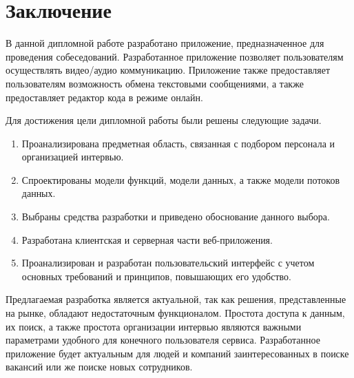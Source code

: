 \section{Заключение}\label{sec:closing}\indent

В данной дипломной работе разработано приложение, предназначенное для проведения собеседований.
Разработанное приложение позволяет пользователям осуществлять видео/аудио коммуникацию.
Приложение также предоставляет пользователям возможность обмена текстовыми сообщениями, а также предоставляет редактор кода в режиме онлайн.

Для достижения цели дипломной работы были решены следующие задачи.
\begin{enumerate}
    \item Проанализирована предметная область, связанная с подбором персонала и организацией интервью.
    \item Спроектированы модели функций, модели данных, а также модели потоков данных.
    \item Выбраны средства разработки и приведено обоснование данного выбора.
    \item Разработана клиентская и серверная части веб-приложения.
    \item Проанализирован и разработан пользовательский интерфейс с учетом основных требований и принципов, повышающих его удобство.
\end{enumerate}

Предлагаемая разработка является актуальной, так как решения, представленные на рынке, обладают недостаточным функционалом.
Простота доступа к данным, их поиск, а также простота организации интервью являются важными параметрами удобного для конечного пользователя сервиса.
Разработанное приложение будет актуальным для людей и компаний заинтересованных в поиске вакансий или же поиске новых сотрудников.
